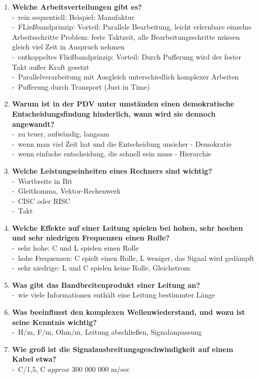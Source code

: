 \documentclass[a4paper,12pt]{article}
\newcommand{\questionnopage}[2]{\pagebreak[3]\item {\textbf{#1?}}#2}
\newcommand{\catchword}[1]{\\-\ #1}
\begin{document}
\begin{enumerate}
  
    \questionnopage{Welche Arbeitsverteilungen gibt es}
  {
    \catchword{rein sequentiell: Beispiel: Manufaktur}
    \catchword{FLießbandprinzip: Vorteil: Parallele Bearbeitung,
    leicht erlernbare einzelne Arbeitsschritte Problem: feste Taktzeit, alle 
    Bearbeitungsschritte müssen gleich viel Zeit in Anspruch nehmen}
    \catchword{entkoppeltes Fließbandprinzip: Vorteil: Durch Pufferung wird der
    fester Takt außer Kraft gesetzt}
    \catchword{Parallelverarbeitung mit Ausgleich unterschiedlich komplexer Arbeiten}
    \catchword{Pufferung durch Transport (Just in Time)}
  }
  
  \questionnopage{Warum ist in der PDV unter umständen einen demokratische 
  Entscheidungsfindung hinderlich, wann wird sie dennoch angewandt}
  {
    \catchword{zu teuer, aufwändig, langsam}
    \catchword{wenn man viel Zeit hat und die Entscheidung unsicher - Demokratie}
    \catchword{wenn einfache entscheidung, die schnell sein muss - Hierarchie}
  }
  
    \questionnopage{Welche Leistungseinheiten eines Rechners sind wichtig}
  {
    \catchword{Wortbreite in Bit}
    \catchword{Gleitkomma, Vektor-Rechenwerk}
    \catchword{CISC oder RISC}
    \catchword{Takt}
    
  }
  
    \questionnopage{Welche Effekte auf einer Leitung spielen bei hohen, 
    sehr hoehen und sehr niedrigen Frequenzen einen Rolle}
  {
    \catchword{sehr hohe: C und L spielen einen Rolle}
    \catchword{hohe Frequenzen: C spielt einen Rolle, L weniger, 
    das Signal wird gedämpft}
    \catchword{sehr niedrige: L und C spielen keine Rolle, Gleichstrom}
    
  }
  
  \questionnopage{Was gibt das Bandbreitenprodukt einer Leitung an}
  {
    \catchword{wie viele Informationen enthält eine Leitung bestimmter Länge}
    
  }
  
    \questionnopage{Was beeinflusst den komplexen Wellenwiederstand, und wozu ist 
    seine Kenntnis wichtig}
  {
    \catchword{H/m, F/m, Ohm/m, Leitung abschließen, Signalanpassung}
    
  }
  
    \questionnopage{Wie groß ist die Signalausbreitungsgeschwindigkeit auf einem 
    Kabel etwa}
  {
    \catchword{C/1,5, C $approx$ 300 000 000 m/sec}
    
  }
  
  
  

\end{enumerate}
\end{document}
